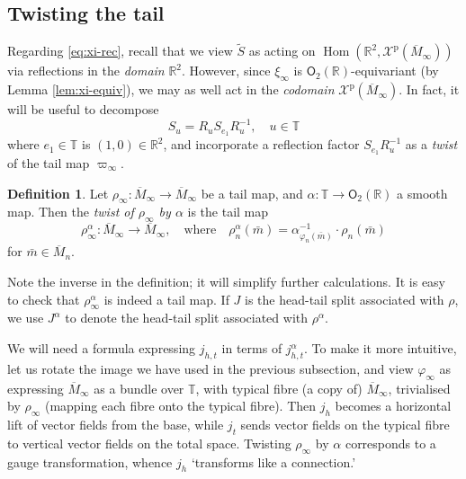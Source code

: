 \documentclass{article}
\def\RR{\mathbb{R}}
\def\TT{\mathbb{T}}
\def\XX{\mathcal{X}}
\def\O{\mathsf{O}}
\DeclareMathOperator{\Hom}{\mathrm{Hom}}
\def\p{\mathrm{p}}
\theoremstyle{definition}
\newtheorem{defn}{Definition}
\begin{document}
\subsection{Twisting the tail}
Regarding \eqref{eq:xi-rec}, recall that
we view $\tilde S$ as acting on $\Hom(\RR^2, \XX^\p(\overline M_\infty))$
via reflections in the \emph{domain} $\RR^2$. However, since $\xi_\infty$
is $\O_2(\RR)$-equivariant (by Lemma \ref{lem:xi-equiv}), we may as well
act in the \emph{codomain} $\XX^\p(\overline M_\infty)$. In fact, it will
be useful to decompose
$$ S_u = R_u S_{e_1} R_u^{-1},\quad u \in \TT $$
where $e_1 \in \TT$ is $(1,0) \in \RR^2$, and
incorporate a reflection factor $S_{e_1} R_u^{-1}$ as a \emph{twist}
of the tail map $\varpi_\infty$.
\begin{defn}
Let $\rho_\infty : \overline M_\infty \to \overline M_\infty$ be a tail map,
and $\alpha : \TT \to \O_2(\RR)$ a smooth map. Then the \emph{twist of $\rho_\infty$ by $\alpha$}
is the tail map 
$$\rho^\alpha_\infty : \overline M_\infty \to \overline M_\infty,\quad\textrm{where}\quad
\rho^\alpha_n(\bar m) = \alpha_{\varphi_n(\bar m)}^{-1} \cdot \rho_n(\bar m) $$
for $\bar m \in \overline M_n$.
\end{defn}
Note the inverse in the definition; it will simplify further calculations.
It is easy to check that $\rho^\alpha_\infty$ is indeed a tail map.
If $J$ is the head-tail split associated with $\rho$,
we use $J^\alpha$ to denote the head-tail split
associated with $\rho^\alpha$. 

We will need a formula expressing
$ j_{h,t}$ in terms of $ j^\alpha_{h,t}$.
To make it more intuitive, let us rotate the image we have used in the previous subsection,
and view $\varphi_\infty$ as expressing $\overline M_\infty$ as a bundle over $\TT$,
with typical fibre (a copy of) $\overline M_\infty$, trivialised by $\rho_\infty$ (mapping each fibre
onto the typical fibre). Then $ j_h$ becomes a horizontal lift of vector fields from the base, while $ j_t$
sends vector fields on the typical fibre to vertical vector fields on the total space.
Twisting $\rho_\infty$ by $\alpha$ corresponds to a gauge transformation, whence
$j_h$ `transforms like a connection.'
\end{document}

